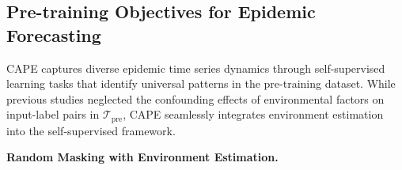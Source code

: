 \subsection{Pre-training Objectives for Epidemic Forecasting}
\label{sec: contrast}
CAPE captures diverse epidemic time series dynamics through self-supervised learning tasks that identify universal patterns in the pre-training dataset. While previous studies neglected the confounding effects of environmental factors on input-label pairs in \( \mathcal{T}_{\text{pre}} \), CAPE seamlessly integrates environment estimation into the self-supervised framework.

{\noindent\textbf{Random Masking with Environment Estimation.} 
}
